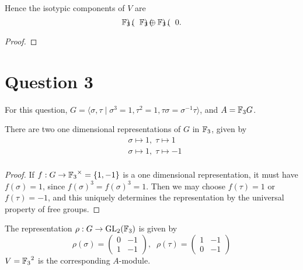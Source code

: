 \documentclass{unswmaths}
\begin{document}
\begin{corollary}
    Hence the isotypic components of $V$ are
    \begin{equation*}
        {\mathbb{F}_3}\begin{pmatrix}
        
        \end{pmatrix},\;\;{\mathbb{F}_3}\begin{pmatrix}  \end{pmatrix}\oplus{\mathbb{F}_3}\begin{pmatrix} \end{pmatrix},\;\;0.
    \end{equation*}
\end{corollary}
\begin{proof}
    
\end{proof}

\section*{Question 3}
For this question, $G = \langle \sigma,\tau\;|\;\sigma^3=1,\tau^2=1,\tau\sigma = \sigma^{-1}\tau\rangle$,
and $A = {\mathbb{F}_3} G$.

\begin{theorem}
\label{1dimreps}
    There are two one dimensional representations of $G$ in ${\mathbb{F}_3}$, given by
    \begin{align*}
        &\sigma\mapsto 1,\;\tau\mapsto 1\\
        &\sigma\mapsto 1,\;\tau\mapsto -1\\
    \end{align*}
\end{theorem}
\begin{proof}
        If $f:G\rightarrow {\mathbb{F}_3}^\times = \{1,-1\}$ is a one dimensional representation, it
        must have $f(\sigma) = 1$, since $f(\sigma)^3 = f(\sigma)^3 = 1$. 
        Then we may choose $f(\tau) = 1$ or $f(\tau) = -1$, and this uniquely
        determines the representation by the universal property of free groups.
\end{proof}

\begin{definition}
    The representation $\rho:G\rightarrow \operatorname{GL}_2({\mathbb{F}_3})$ is given by
    \begin{equation*}
        \rho(\sigma) = \begin{pmatrix}
            0 & -1\\
            1 & -1
        \end{pmatrix},\;\;
        \rho(\tau) = \begin{pmatrix}
            1 & -1\\
            0 & -1
        \end{pmatrix}
    \end{equation*}
    $V = {\mathbb{F}_3}^2$ is the corresponding $A$-module.
\end{definition}
\end{document}
